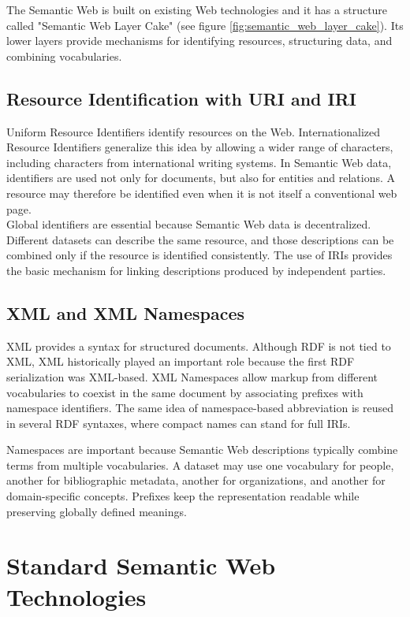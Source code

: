\documentclass{scrbook}
\begin{document}
	The Semantic Web is built on existing Web technologies and it has a structure called "Semantic Web Layer Cake" (see figure \ref{fig:semantic_web_layer_cake}). Its lower layers provide mechanisms for identifying resources, structuring data, and combining vocabularies.
	
	\subsection{Resource Identification with URI and IRI}
	
	Uniform Resource Identifiers identify resources on the Web. Internationalized Resource Identifiers generalize this idea by allowing a wider range of characters, including characters from international writing systems. In Semantic Web data, identifiers are used not only for documents, but also for entities and relations. A resource may therefore be identified even when it is not itself a conventional web page.\\
	
	Global identifiers are essential because Semantic Web data is decentralized. Different datasets can describe the same resource, and those descriptions can be combined only if the resource is identified consistently. The use of IRIs provides the basic mechanism for linking descriptions produced by independent parties.
	
	\subsection{XML and XML Namespaces}
	
	XML provides a syntax for structured documents. Although RDF is not tied to XML, XML historically played an important role because the first RDF serialization was XML-based. XML Namespaces allow markup from different vocabularies to coexist in the same document by associating prefixes with namespace identifiers. The same idea of namespace-based abbreviation is reused in several RDF syntaxes, where compact names can stand for full IRIs.
	
	Namespaces are important because Semantic Web descriptions typically combine terms from multiple vocabularies. A dataset may use one vocabulary for people, another for bibliographic metadata, another for organizations, and another for domain-specific concepts. Prefixes keep the representation readable while preserving globally defined meanings.
	
	\section{Standard Semantic Web Technologies}
	
\end{document}
